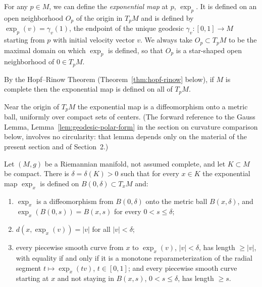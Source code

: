 \begin{definition}
\label{def:exponential-map}
\leanok



For any $p\in M$, we can define the \textit{exponential
map} at $p$, $\exp_{p}$. It is
defined on an open neighborhood $O_{p}$ of the origin in $T_{p}M$
and is defined by $\exp_{p}(v)=\gamma_v(1)$, the endpoint of
the unique geodesic $\gamma_v\colon [0,1]\rightarrow M$ starting
from $p$ with initial velocity vector $v$. We always take
$O_{p}\subset T_{p}M$ to be the maximal domain on which $\exp_p$ is defined, so that $O_{p}$ is a star-shaped open
neighborhood of $0\in T_pM$.
\end{definition}

By the Hopf--Rinow Theorem (Theorem~\ref{thm:hopf-rinow} below),
if $M$ is complete then the exponential map is defined on all of
$T_pM$.

Near the origin of $T_pM$ the exponential map is a diffeomorphism
onto a metric ball, uniformly over compact sets of centers. (The
forward reference to the Gauss Lemma,
Lemma~\ref{lem:geodesic-polar-form} in the section on curvature
comparison below, involves no circularity: that lemma depends only
on the material of the present section and of
Section~2.)

\begin{lemma}
\label{lem:normal-ball}

Let $(M,g)$ be a Riemannian manifold, not assumed complete, and let
$K\subset M$ be compact. There is $\delta=\delta(K)>0$ such that
for every $x\in K$ the exponential map $\exp_x$ is defined on
$B(0,\delta)\subset T_xM$ and:
\begin{enumerate}
\item $\exp_x$ is a diffeomorphism from $B(0,\delta)$ onto the
metric ball $B(x,\delta)$, and $\exp_x(B(0,s))=B(x,s)$ for every
$0<s\le\delta$;
\item $d(x,\exp_x(v))=|v|$ for all $|v|<\delta$;
\item every piecewise smooth curve from $x$ to $\exp_x(v)$,
$|v|<\delta$, has length $\ge|v|$, with equality if and only if it
is a monotone reparameterization of the radial segment
$t\mapsto\exp_x(tv)$, $t\in[0,1]$; and every piecewise smooth
curve starting at $x$ and not staying in $B(x,s)$, $0<s\le\delta$,
has length $\ge s$.
\end{enumerate}
\end{lemma}

